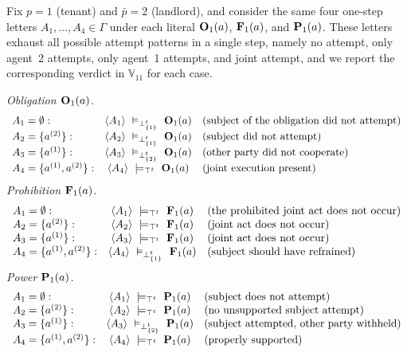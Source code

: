 \begin{example}
  Fix $p=1$ (tenant) and $\bar p=2$ (landlord), and consider the same four one-step letters $A_1,\dots,A_4\in\Gamma$ under each literal $\obl[1]{a}$, $\frb[1]{a}$, and $\perm[1]{a}$.  
  These letters exhaust all possible attempt patterns in a single step, namely no attempt, only agent~2 attempts, only agent~1 attempts, and joint attempt, and we report the corresponding verdict in $\mathbb{V}_{11}$ for each case.

\smallskip
\noindent\emph{Obligation \(\obl[1]{a}\).}
\[
\begin{array}{lcl}
A_1=\emptyset: & \trace{A_1}\ \vDash_{\bottp{\{1\}}}\ \obl[1]{a} & \text{(subject of the obligation did not attempt)}\\
A_2=\{a^{(2)}\}: & \trace{A_2}\ \vDash_{\bottp{\{1\}}}\ \obl[1]{a} & \text{(subject did not attempt)}\\
A_3=\{a^{(1)}\}: & \trace{A_3}\ \vDash_{\bottp{\{2\}}}\ \obl[1]{a} & \text{(other party did not cooperate)}\\
A_4=\{a^{(1)},a^{(2)}\}: & \trace{A_4}\ \satt\ \obl[1]{a} & \text{(joint execution present)}
\end{array}
\]
\noindent\emph{Prohibition \(\frb[1]{a}\).}
\[
\begin{array}{lcl}
A_1=\emptyset: & \trace{A_1}\ \satt\ \frb[1]{a} & \text{(the prohibited joint act does not occur)}\\
A_2=\{a^{(2)}\}: & \trace{A_2}\ \satt\ \frb[1]{a} & \text{(joint act does not occur)}\\
A_3=\{a^{(1)}\}: & \trace{A_3}\ \satt\ \frb[1]{a} & \text{(joint act does not occur)}\\
A_4=\{a^{(1)},a^{(2)}\}: & \trace{A_4}\ \vDash_{\bottp{\{1\}}}\ \frb[1]{a} & \text{(subject should have refrained)}
\end{array}
\]
\noindent\emph{Power \(\perm[1]{a}\).}
\[
\begin{array}{lcl}
A_1=\emptyset: & \trace{A_1}\ \satt\ \perm[1]{a} & \text{(subject does not attempt)}\\
A_2=\{a^{(2)}\}: & \trace{A_2}\ \satt\ \perm[1]{a} & \text{(no unsupported subject attempt)}\\
A_3=\{a^{(1)}\}: & \trace{A_3}\ \vDash_{\bottp{\{2\}}}\ \perm[1]{a} & \text{(subject attempted, other party withheld)}\\
A_4=\{a^{(1)},a^{(2)}\}: & \trace{A_4}\ \satt\ \perm[1]{a} & \text{(properly supported)}
\end{array}
\]
\end{example}

